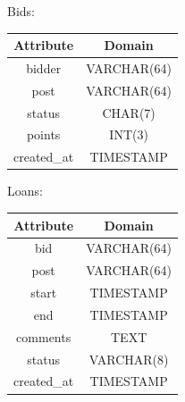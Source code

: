 \begin{center}
Bids: \quad
\begin{tabular}{|c|c|}
\hline
Attribute & Domain\\
\hline
bidder & VARCHAR(64)\\
post & VARCHAR(64) \\
status & CHAR(7) \\
points & INT(3) \\
created\_at & TIMESTAMP \\
\hline
\end{tabular}
\end{center}

\begin{center}
Loans: \quad
\begin{tabular}{|c|c|}
\hline
Attribute & Domain\\
\hline
bid & VARCHAR(64)\\
post & VARCHAR(64) \\
start & TIMESTAMP \\
end & TIMESTAMP \\
comments & TEXT \\
status & VARCHAR(8) \\
created\_at & TIMESTAMP \\
\hline
\end{tabular}
\end{center}

